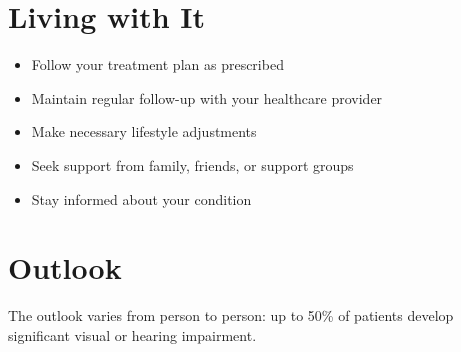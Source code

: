 \section{Living with It}
\begin{itemize}[noitemsep]
  \item Follow your treatment plan as prescribed
  \item Maintain regular follow-up with your healthcare provider
  \item Make necessary lifestyle adjustments
  \item Seek support from family, friends, or support groups
  \item Stay informed about your condition
\end{itemize}
\section{Outlook}
The outlook varies from person to person: up to 50\% of patients develop significant visual or hearing impairment.
